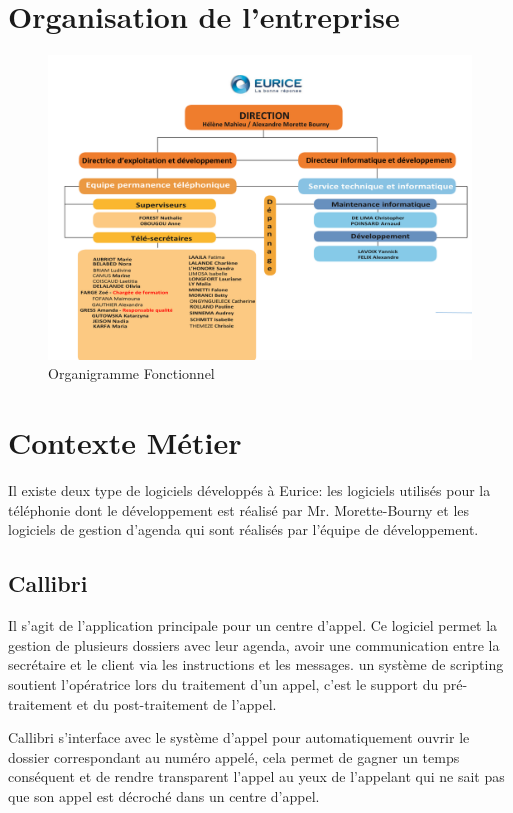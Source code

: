 \section{Organisation de l'entreprise}
\begin{figure}[h]
	\centering
	\includegraphics[width=1\linewidth]{Images/organigramme_fonctionnel}
	\caption{Organigramme Fonctionnel}
	\label{fig:organigrammefonctionnel}
\end{figure}

\section{Contexte Métier}
Il existe deux type de logiciels développés à Eurice: 
les logiciels utilisés pour la téléphonie dont le développement est réalisé par Mr. Morette-Bourny 
et les logiciels de gestion d'agenda qui sont réalisés par l'équipe de développement. \newline


\subsection{Callibri}
Il s'agit de l'application principale pour un centre d'appel. 
Ce logiciel permet la gestion de plusieurs dossiers avec leur agenda, 
avoir une communication entre la secrétaire et le client via les instructions et les messages. 
un système de scripting soutient l'opératrice lors du traitement d'un appel, 
c'est le support du pré-traitement et du post-traitement de l'appel. \newline

\gls{Callibri} s'interface avec le système d'appel pour automatiquement ouvrir le dossier correspondant 
au numéro appelé, cela permet de gagner un temps conséquent 
et de rendre transparent l'appel au yeux de l'appelant qui ne sait pas 
que son appel est décroché dans un centre d'appel. \newline


